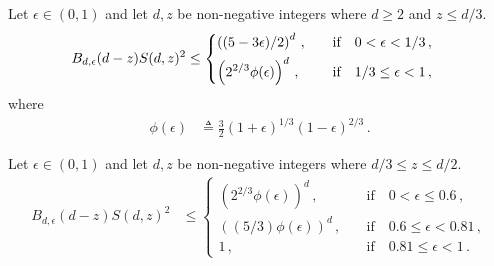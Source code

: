


\begin{claim}\label{claim:t1star-variance-exact}
  Let $\epsilon \in (0,1)$ and 
  let $d,z$ be non-negative integers where $d \geq 2$ and $z \leq d/3$. 
  \begin{align*}
    B_{d, \epsilon}(d-z) S(d,z)^2
    &\leq \begin{dcases} 
    \left( (5-3 \epsilon)/2 \right)^d \,,
        &\quad \text{if}\quad
        0 < \epsilon < 1/3 \,, \\
    \left( 2^{2/3} \phi(\epsilon) \right)^d \,,
        &\quad \text{if}\quad
        1/3 \leq \epsilon < 1 \, ,
    \end{dcases}
  \end{align*}
  where
  \begin{align}
    \phi(\epsilon) 
    &\triangleq \frac{3}{2} (1+\epsilon)^{1/3} (1-\epsilon)^{2/3}\label{eq:phi_eps} 
    \,.
  \end{align}
\end{claim}

\begin{claim}\label{claim:t2star-variance-exact}
  Let $\epsilon \in (0,1)$ and 
  let $d,z$ be non-negative integers where $d/3 \leq z \leq d/2$. 
  \begin{align*}
    B_{d, \epsilon}(d-z) S(d,z)^2
    &\leq \begin{cases} 
    \left( 2^{2/3} \phi(\epsilon) \right)^d \,,
        &\quad\text{if}\quad 0 < \epsilon \leq 0.6\,, \\
    \left( (5/3) \phi(\epsilon)  \right)^d \,,
        &\quad\text{if}\quad 0.6\leq \epsilon < 0.81\,, \\
    1 \,,
        &\quad\text{if}\quad 0.81 \leq \epsilon < 1
        \,.
    \end{cases}
  \end{align*}
\end{claim}



